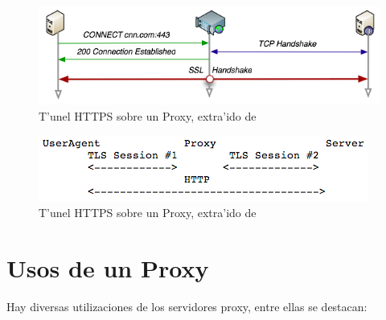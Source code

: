\begin{figure}[h]
  	\centering
	\includegraphics[width=\textwidth]{img/proxy_2}
	\caption{\small T'unel HTTPS sobre un Proxy, extra'ido de \cite{secureProxies}}
	\label{proxy_2}
\end{figure}

\begin{figure}[h]
  	\centering
	\includegraphics[width=\textwidth]{img/trustedProxy}
	\caption{\small T'unel HTTPS sobre un Proxy, extra'ido de \cite{draftTrustedProxy}}
	\label{trustedProxy}
\end{figure}

\section{Usos de un Proxy}

Hay diversas utilizaciones de los servidores proxy, entre ellas se destacan:

